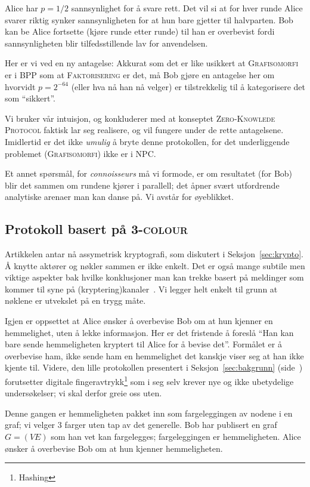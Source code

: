 \documentclass[a4paper, parskip=half]{scrartcl}
\theoremstyle{definition}
\begin{document}
Alice har $p=1/2$ sannsynlighet for å svare rett.  Det vil si at for
hver runde Alice svarer riktig synker sannsynligheten for at hun
bare gjetter til halvparten.  Bob kan be Alice fortsette (kjøre runde
etter runde) til han er overbevist fordi sannsynligheten blir
tilfedsstillende lav for anvendelsen.

Her er vi ved en ny antagelse: Akkurat som det er like usikkert at
\textsc{Grafisomorfi} er i \textsf{BPP} som at
\textsc{Faktorisering} er det, må Bob gjøre en antagelse her om
hvorvidt $p=2^{-64}$ (eller hva nå han nå velger) er tilstrekkelig til
å kategorisere det som ``sikkert''.

Vi bruker vår intuisjon, og konkluderer med at konseptet
\textsc{Zero-Knowlede Protocol} faktisk lar seg realisere, og vil
fungere under de rette antagelsene.
Imidlertid er det ikke \emph{umulig} å bryte denne protokollen, for
det underliggende problemet (\textsc{Grafisomorfi}) ikke er i
\textsf{NPC}.

Et annet spørsmål, for \textit{connoisseurs} må vi formode, er om
resultatet (for Bob) blir det sammen om rundene kjører i parallell;
det åpner svært utfordrende analytiske arenaer man kan danse på.  Vi
avstår for øyeblikket.


\subsection{Protokoll basert på \textsc{3-colour}}

Artikkelen antar nå assymetrisk kryptografi, som diskutert i
Seksjon~\ref{sec:krypto}.
Å knytte aktører og nøkler sammen er ikke enkelt.  Det er også mange
subtile men viktige aspekter bak hvilke konklusjoner man
kan trekke basert på meldinger som kommer til syne på
(kryptering)kanaler~\cite{Lampson1992Authentication}.  Vi legger helt
enkelt til grunn at nøklene er utvekslet på en trygg måte.

Igjen er oppsettet at Alice ønsker å overbevise Bob om at hun kjenner 
en hemmelighet, uten å lekke informasjon.  Her er det fristende å
foreslå ``Han kan bare sende hemmeligheten kryptert til Alice for å
bevise det''.  Formålet er å overbevise ham, ikke sende ham en
hemmelighet det kanskje viser seg at han ikke kjente til.  Videre, den
lille protokollen presentert i Seksjon~\ref{sec:bakgrunn}
(side~\pageref{sec:bakgrunn}) forutsetter digitale
fingeravtrykk\footnote{Hashing} som i seg selv krever nye og ikke
ubetydelige undersøkelser; vi skal derfor greie oss uten.

Denne gangen er hemmeligheten pakket inn som fargeleggingen av nodene
i en graf; vi velger 3 farger uten tap av det generelle.
Bob har publisert en graf $G=(VE)$ som han vet kan fargelegges;
fargeleggingen er hemmeligheten.  Alice ønsker å overbevise Bob om at
hun kjenner hemmeligheten.
\end{document}

